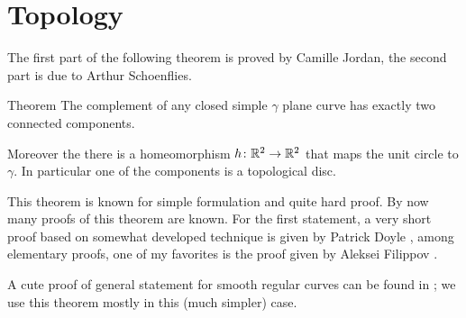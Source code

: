 \section*{Topology}

The first part of the following theorem is proved by Camille Jordan, the second part is due to Arthur Schoenflies.

\begin{thm}{Theorem}
The complement of any closed simple $\gamma$ plane curve has exactly two connected components. 

Moreover the there is a homeomorphism $h\colon\mathbb{R}^2\to \mathbb{R}^2$ that maps the unit circle to $\gamma$.
In particular one of the components is a topological disc.
\end{thm}

This theorem is known for simple formulation and quite hard proof.
By now many proofs of this theorem are known.
For the first statement, a very short proof based on somewhat developed technique is given by Patrick Doyle \cite{doyle},
among elementary proofs, one of my favorites is the proof given by Aleksei Filippov \cite{filippov}.

A cute proof of general statement for smooth regular curves can be found in \cite{chambers-liokumovich}; we use this theorem mostly in this (much simpler) case.


